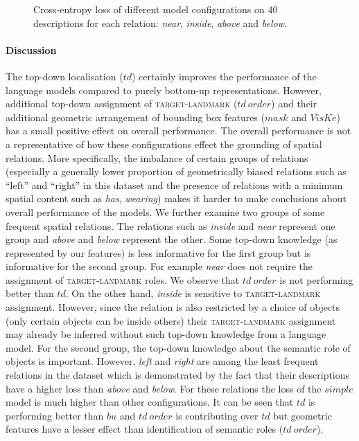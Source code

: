 \begin{figure}[ht!]
\begin{minipage}{0.5\columnwidth}
\end{minipage}%
	\caption{Cross-entropy loss of different model configurations on 40 descriptions for each relation: \emph{near}, \emph{inside}, \emph{above} and \emph{below}.}
	\label{inlg2019:fig:sp_loss}
\end{figure}



\paragraph{Discussion}

The top-down localisation ($td$) certainly improves the performance of the language models
compared to purely bottom-up representations.  
However, additional top-down assignment
of \textsc{target}-\textsc{landmark} ($td~order$) 
and their %
additional geometric arrangement of bounding box features ($mask$ and $VisKe$) has a small positive effect on overall performance.
The overall performance is not a representative of how these configurations effect the grounding of spatial relations.
More specifically, the imbalance of certain groups of relations (especially a generally lower proportion of geometrically biased relations such as ``left'' and ``right'' in this dataset and the presence of relations with a minimum spatial content such as \emph{has}, \emph{wearing}) makes it harder to make conclusions about overall performance of the models. %
We further examine two groups of some frequent spatial relations.
The relations such as \emph{inside} and \emph{near} represent one group
and \emph{above} and \emph{below} represent the other.  
Some top-down knowledge (as represented by our features)
is less informative for the first group but is informative for the
second group. 
For example \emph{near} does not require the assignment of  \textsc{target}-\textsc{landmark} roles. %
We observe that $td~order$ is not performing better than $td$.
On the other hand, \emph{inside} is sensitive to \textsc{target}-\textsc{landmark} assignment. However, since the relation is also restricted by a choice of objects (only certain objects can be inside others)  %
their \textsc{target}-\textsc{landmark} assignment may already be inferred without such top-down knowledge from a language model. 
For the second group, the top-down knowledge
about the semantic role of objects is important. 
However, \emph{left} and \emph{right} are among the least  frequent relations in the dataset which is demonstrated by the fact that their descriptions have a higher loss than \emph{above} and \emph{below}.
For these relations the loss of the $simple$ model is much higher than other configurations. 
It can be seen that $td$ is performing better than $bu$ and $td~order$ is contributing over $td$ but geometric features have a lesser effect than identification of semantic roles ($td~order$).



